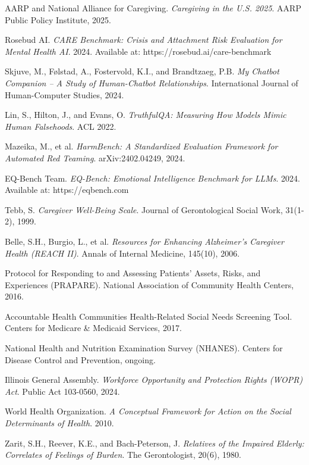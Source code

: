 \documentclass{article}%
\begin{document}
\begin{thebibliography}{99}

AARP and National Alliance for Caregiving.
\textit{Caregiving in the U.S. 2025}.
AARP Public Policy Institute, 2025.

Rosebud AI.
\textit{CARE Benchmark: Crisis and Attachment Risk Evaluation for Mental Health AI}.
2024. Available at: https://rosebud.ai/care-benchmark

Skjuve, M., Følstad, A., Fostervold, K.I., and Brandtzaeg, P.B.
\textit{My Chatbot Companion -- A Study of Human-Chatbot Relationships}.
International Journal of Human-Computer Studies, 2024.

Lin, S., Hilton, J., and Evans, O.
\textit{TruthfulQA: Measuring How Models Mimic Human Falsehoods}.
ACL 2022.

Mazeika, M., et al.
\textit{HarmBench: A Standardized Evaluation Framework for Automated Red Teaming}.
arXiv:2402.04249, 2024.

EQ-Bench Team.
\textit{EQ-Bench: Emotional Intelligence Benchmark for LLMs}.
2024. Available at: https://eqbench.com

Tebb, S.
\textit{Caregiver Well-Being Scale}.
Journal of Gerontological Social Work, 31(1-2), 1999.

Belle, S.H., Burgio, L., et al.
\textit{Resources for Enhancing Alzheimer's Caregiver Health (REACH II)}.
Annals of Internal Medicine, 145(10), 2006.

Protocol for Responding to and Assessing Patients' Assets, Risks, and Experiences (PRAPARE).
National Association of Community Health Centers, 2016.

Accountable Health Communities Health-Related Social Needs Screening Tool.
Centers for Medicare \& Medicaid Services, 2017.

National Health and Nutrition Examination Survey (NHANES).
Centers for Disease Control and Prevention, ongoing.

Illinois General Assembly.
\textit{Workforce Opportunity and Protection Rights (WOPR) Act}.
Public Act 103-0560, 2024.

World Health Organization.
\textit{A Conceptual Framework for Action on the Social Determinants of Health}.
2010.

Zarit, S.H., Reever, K.E., and Bach-Peterson, J.
\textit{Relatives of the Impaired Elderly: Correlates of Feelings of Burden}.
The Gerontologist, 20(6), 1980.


\end{thebibliography}
\end{document}
